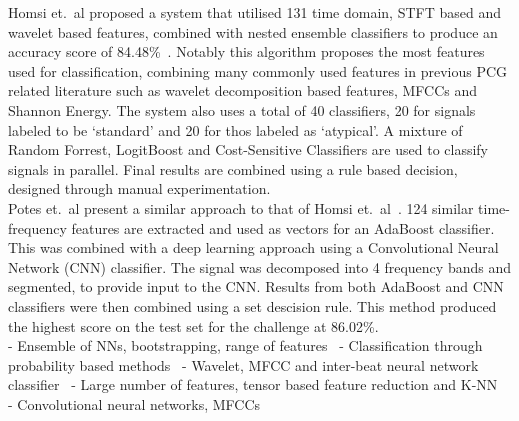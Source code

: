 \documentclass[titlepage, 12pt]{scrartcl} \usepackage{enumitem}
\begin{document}
Homsi et.\ al proposed a system that utilised 131 time domain, STFT based and
wavelet based features, combined with nested ensemble classifiers to produce an
accuracy score of 84.48\%~\citeyearpar{Homsi2017}. Notably this algorithm
proposes the most features used for classification, combining many commonly
used features in previous PCG related literature such as wavelet decomposition
based features, MFCCs and Shannon Energy. The system also uses a total of 40
classifiers, 20 for signals labeled to be `standard' and 20 for thos labeled as
`atypical'. A mixture of Random Forrest, LogitBoost and Cost-Sensitive
Classifiers are used to classify signals in parallel. Final results are
combined using a rule based decision, designed through manual experimentation.\\

Potes et.\ al present a similar approach to that of Homsi et.\
al~\citeyearpar{Potes2016}. 124 similar time-frequency features are extracted
and used as vectors for an AdaBoost classifier. This was combined with a deep
learning approach using a Convolutional Neural Network (CNN) classifier. The
signal was decomposed into 4 frequency bands and segmented, to provide input to
the CNN. Results from both AdaBoost and CNN classifiers were then combined
using a set descision rule.  This method produced the highest score on the test
set for the challenge at 86.02\%.\\

- Ensemble of NNs, bootstrapping, range of features~\parencite{Zabihi2016}
- Classification through probability based methods~\parencite{Plesinger2017}
- Wavelet, MFCC and inter-beat neural network classifier~\parencite{Kay2017}
- Large number of features, tensor based feature reduction and
K-NN~\parencite{Bobillo2016}
- Convolutional neural networks, MFCCs~\parencite{Rubin2016}
\end{document}
